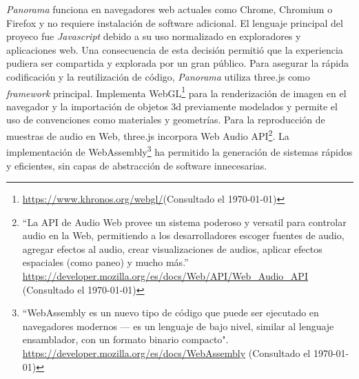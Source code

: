 
\textit{Panorama} funciona en navegadores web actuales como Chrome, Chromium o Firefox y no requiere instalación de software adicional. El lenguaje principal del proyeco fue \textit{Javascript} debido a su uso normalizado en exploradores y aplicaciones web. Una consecuencia de esta decisión permitió que la experiencia pudiera ser compartida y explorada por un gran público. Para asegurar la rápida codificación y la reutilización de código, \textit{Panorama} utiliza three.js como \textit{framework} principal. Implementa WebGL\footnote{\url{https://www.khronos.org/webgl/}(Consultado el \today)} para la renderización de imagen en el navegador y la importación de objetos 3d previamente modelados y permite el uso de convenciones como materiales y geometrías. Para la reproducción de muestras de audio en Web, three.js incorpora Web Audio API\footnote{``La API de Audio Web provee un sistema poderoso y versatil para controlar audio en la Web, permitiendo a los desarrolladores escoger fuentes de audio, agregar efectos al audio, crear visualizaciones de audios, aplicar efectos espaciales (como paneo) y mucho más.'' \url{https://developer.mozilla.org/es/docs/Web/API/Web_Audio_API} (Consultado el \today)}. La implementación de WebAssembly\footnote{``WebAssembly es un nuevo tipo de código que puede ser ejecutado en navegadores modernos — es un lenguaje de bajo nivel, similar al lenguaje ensamblador, con un formato binario compacto". \url{https://developer.mozilla.org/es/docs/WebAssembly} (Consultado el \today) } ha permitido la generación de sistemas rápidos y eficientes, sin capas de abstracción de software innecesarias. %


  


